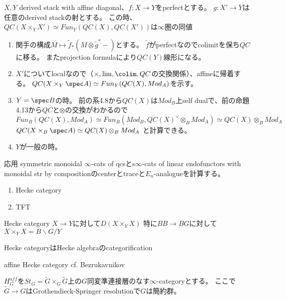 \documentclass[dvipdfmx]{beamer}
\begin{document}
\begin{frame}
\begin{thm}[BFNのTheorem 4.14]
$X, Y$ derived stack with affine diagonal、$f:X \to Y$をperfectとする。
$g:X' \to Y$は任意のderived stackの射とする。
この時、$QC (X \times_Y X') \simeq Fun_Y(QC(X),QC(X'))$は$\infty$圏の同値
\end{thm}
\begin{enumerate}
\item 関手の構成$M\mapsto \tilde{f}_*(M\otimes\tilde{g}^*-)$とする。
$\tilde{f}$がperfectなのでcolimitを保ち$QC$に移る。
またprojection formulaにより$QC(Y)$線形になる。

\item $X'$についてlocalなので（$\times, \lim, \colim, QC$の交換関係）、affineに帰着する。
$QC(X\times_Y\spec A) \simeq Fun_Y(QC(X),Mod_A)$を示す。

\item $Y=\spec B$の時。
前の系4.8から$QC(X)$は$Mod_B$上self dualで、前の命題4.13から$QC$と$\otimes$の交換がわかるので
$Fun_B(QC(X),Mod_A)\simeq Fun_B(Mod_B,QC(X)^\vee\otimes_BMod_A)\simeq QC(X)\otimes_BMod_A$
$QC(X\times_B\spec A)\simeq QC(X)\otimes_BMod_A$
と計算できる。

\item $Y$が一般の時。
\end{enumerate}
\end{frame}

\begin{frame}{応用}
symmetric monoidal $\infty$-cats of qcsとs$\infty$-cats of linear endofunctors with monoidal str by compositionのcenterとtraceと$E_n$-analogueを計算する。
\begin{enumerate}
\item Hecke category
\item TFT
\end{enumerate}

\end{frame}

\begin{frame}{Hecke category}
$X \to Y$に対して$D(X\times_YX)$
特に$BB \to BG$に対して$X\times_YX=B\backslash G/Y$

Hecke categoryはHecke algebraのcategorification
\end{frame}

\begin{frame}{affine Hecke category}
cf. Bezrukavnikov

$H^{aff}_G$を$St_G=\tilde{G}\times_G\tilde{G}$上の$G$同変準連接層のなす$\infty$-categoryとする。
ここで$\tilde{G} \to G$はGrothendieck-Springer resolutionで$G$は簡約群。
\end{frame}
\end{document}
